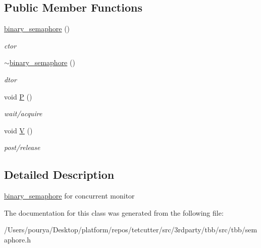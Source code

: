 \subsection*{Public Member Functions}
\begin{DoxyCompactItemize}
\item 
\hypertarget{classtbb_1_1internal_1_1binary__semaphore_a0e81169e37cd223e39e1552268a539ca}{}\hyperlink{classtbb_1_1internal_1_1binary__semaphore_a0e81169e37cd223e39e1552268a539ca}{binary\+\_\+semaphore} ()\label{classtbb_1_1internal_1_1binary__semaphore_a0e81169e37cd223e39e1552268a539ca}

\begin{DoxyCompactList}\small\item\em ctor \end{DoxyCompactList}\item 
\hypertarget{classtbb_1_1internal_1_1binary__semaphore_ab064e1788cd6a4e15145efe2b2df3f13}{}\hyperlink{classtbb_1_1internal_1_1binary__semaphore_ab064e1788cd6a4e15145efe2b2df3f13}{$\sim$binary\+\_\+semaphore} ()\label{classtbb_1_1internal_1_1binary__semaphore_ab064e1788cd6a4e15145efe2b2df3f13}

\begin{DoxyCompactList}\small\item\em dtor \end{DoxyCompactList}\item 
\hypertarget{classtbb_1_1internal_1_1binary__semaphore_af2248191c45e9442d39805db03cdbb34}{}void \hyperlink{classtbb_1_1internal_1_1binary__semaphore_af2248191c45e9442d39805db03cdbb34}{P} ()\label{classtbb_1_1internal_1_1binary__semaphore_af2248191c45e9442d39805db03cdbb34}

\begin{DoxyCompactList}\small\item\em wait/acquire \end{DoxyCompactList}\item 
\hypertarget{classtbb_1_1internal_1_1binary__semaphore_a737af267999b3cdf979b1ec26ae71516}{}void \hyperlink{classtbb_1_1internal_1_1binary__semaphore_a737af267999b3cdf979b1ec26ae71516}{V} ()\label{classtbb_1_1internal_1_1binary__semaphore_a737af267999b3cdf979b1ec26ae71516}

\begin{DoxyCompactList}\small\item\em post/release \end{DoxyCompactList}\end{DoxyCompactItemize}


\subsection{Detailed Description}
\hyperlink{classtbb_1_1internal_1_1binary__semaphore}{binary\+\_\+semaphore} for concurrent monitor 

The documentation for this class was generated from the following file\+:\begin{DoxyCompactItemize}
\item 
/\+Users/pourya/\+Desktop/platform/repos/tetcutter/src/3rdparty/tbb/src/tbb/semaphore.\+h\end{DoxyCompactItemize}
